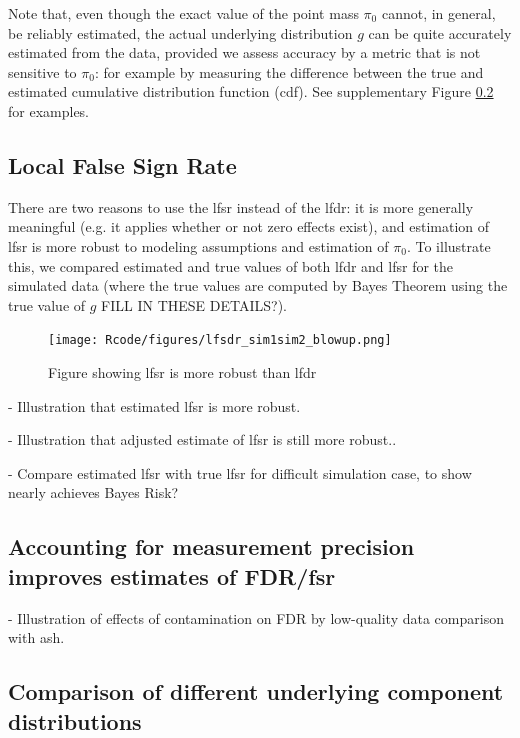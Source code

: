 \documentclass[10pt]{article}
\begin{document}
Note that, even though the exact value of the point mass $\pi_0$ cannot, in general, be reliably estimated, the actual underlying distribution $g$ 
can be quite accurately estimated from the data, provided we assess accuracy by a metric that is not sensitive to $\pi_0$: for example
by measuring the difference between the true and estimated cumulative distribution function (cdf). See supplementary Figure \ref{} for examples.

\subsection*{Local False Sign Rate}

There are two reasons to use the lfsr instead of the lfdr: it is more generally meaningful (e.g. it applies
whether or not zero effects exist),  and estimation of lfsr is more robust to modeling assumptions and estimation of $\pi_0$. 
To illustrate this, we compared estimated and true values of both lfdr and lfsr for the simulated data (where the true
values are computed by Bayes Theorem using the true value of $g$ FILL IN THESE DETAILS?). 



\begin{figure}[!ht]
\begin{center}
\texttt{[image: Rcode/figures/lfsdr\_sim1sim2\_blowup.png]}
\end{center}
\caption{Figure showing lfsr is more robust than lfdr}
\end{figure}

- Illustration that estimated lfsr is more robust.

- Illustration that adjusted estimate of lfsr is still more robust..

- Compare estimated lfsr with true lfsr for difficult simulation case, to show nearly achieves Bayes Risk?

\subsection{Accounting for measurement precision improves estimates of FDR/fsr}
 
- Illustration of effects of contamination on FDR by low-quality data
comparison with ash.



\subsection{Comparison of different underlying component distributions}
\end{document}
